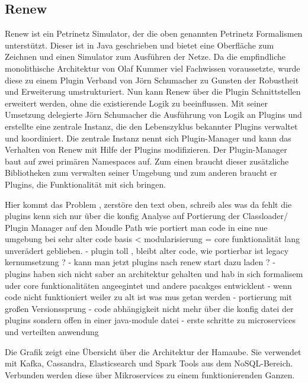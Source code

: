\subsection{Renew} 
Renew ist ein Petrinetz Simulator, der die oben genannten Petrinetz Formalismen unterstützt. Dieser ist in Java geschrieben und bietet eine Oberfläche zum Zeichnen und einen Simulator zum Ausführen der Netze. \newline 
Da die empfindliche monolithische Architektur von Olaf Kummer viel Fachwissen voraussetzte, wurde diese zu einem Plugin Verband von Jörn Schumacher zu Gunsten der Robustheit und Erweiterung umstrukturiert. Nun kann Renew über die Plugin Schnittstellen erweitert werden, ohne die existierende Logik zu beeinflussen. \bigbreak
Mit seiner Umsetzung delegierte Jörn Schumacher die Ausführung von Logik an Plugins und erstellte eine zentrale Instanz, die den Lebenszyklus bekannter Plugins verwaltet und koordiniert. Die zentrale Instanz nennt sich Plugin-Manager und kann das Verhalten von Renew mit Hilfe der Plugins modifizieren.
Der Plugin-Manager baut auf zwei primären Namespaces auf. Zum einen braucht dieser zusätzliche Bibliotheken zum verwalten seiner Umgebung und zum anderen braucht er Plugins, die Funktionalität mit sich bringen. 
\bigbreak 

Hier kommt das Problem , zerstöre den text oben, schreib ales was da fehlt 
die plugins kenn sich  nur über die konfig 
Analyse auf Portierung der Classloader/ Plugin Manager auf den Moudle Path 
wie portiert man code in eine nue umgebung bei sehr alter code basis < modularisierung = core funktionalität lang unverädert geblieben.
- plugin toll , bleibt alter code, wie portierbar ist legacy  kernumsetzung ?
- kann man jetzt plugins nach renew start  dazu laden ?
- plugins haben sich nicht saber an  architektur gehalten und hab in sich formalisem uder core funktionalitäten angeegintet  und andere pacakges entwicklent 
- wenn code nicht funktioniert weiler zu alt ist was mus getan werden 
- portierung  mit großen Versionssprung 
- code abhängigkeit nicht mehr über die konfig datei der plugins sondern offen in einer java-module datei
- erste schritte zu microservices und verteilten anwendung 





Die Grafik zeigt eine Übersicht über die Architektur der Hamaube. Sie
verwendet mit Kafka, Cassandra, Elasticsearch und Spark Tools aus dem
NoSQL-Bereich. Verbunden werden diese über Mikroservices zu einem
funktionierenden Ganzen.

